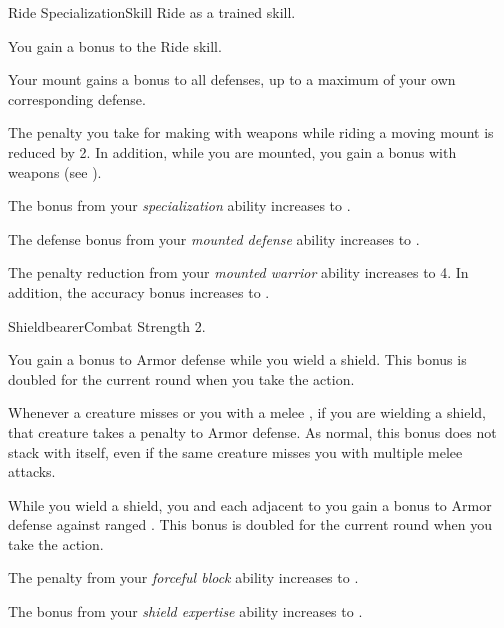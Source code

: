     \begin{feat}{Ride Specialization}{Skill}
        \featpre Ride as a trained skill.

         You gain a  bonus to the Ride skill.

         Your mount gains a  bonus to all defenses, up to a maximum of your own corresponding defense.

         The penalty you take for making  with  weapons while riding a moving mount is reduced by 2.
        In addition, while you are mounted, you gain a   bonus with  weapons (see ).

         The bonus from your \textit{specialization} ability increases to .

         The defense bonus from your \textit{mounted defense} ability increases to .

         The penalty reduction from your \textit{mounted warrior} ability increases to 4.
        In addition, the accuracy bonus increases to .
    \end{feat}

    \begin{feat}{Shieldbearer}{Combat}
        \featpre Strength 2.

         You gain a  bonus to Armor defense while you wield a shield.
        This bonus is doubled for the current round when you take the  action.

         Whenever a creature misses or  you with a melee , if you are wielding a shield, that creature  takes a  penalty to Armor defense.
        As normal, this bonus does not stack with itself, even if the same creature misses you with multiple melee attacks.

         While you wield a shield, you and each  adjacent to you gain a  bonus to Armor defense against ranged .
        This bonus is doubled for the current round when you take the  action.

         The penalty from your \textit{forceful block} ability increases to .

         The bonus from your \textit{shield expertise} ability increases to .
    \end{feat}

